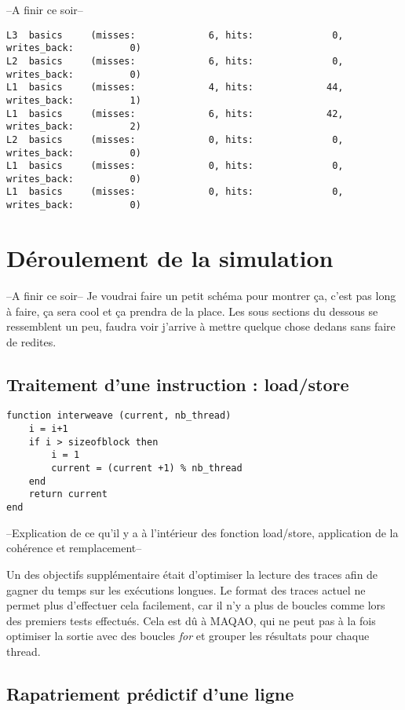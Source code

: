 --A finir ce soir--

\begin{lstlisting}
L3  basics     (misses:             6, hits:              0, writes_back:          0)
L2  basics     (misses:             6, hits:              0, writes_back:          0)
L1  basics     (misses:             4, hits:             44, writes_back:          1)
L1  basics     (misses:             6, hits:             42, writes_back:          2)
L2  basics     (misses:             0, hits:              0, writes_back:          0)
L1  basics     (misses:             0, hits:              0, writes_back:          0)
L1  basics     (misses:             0, hits:              0, writes_back:          0)
\end{lstlisting}

\section{Déroulement de la simulation}

--A finir ce soir--
Je voudrai faire un petit schéma pour montrer ça, c'est pas long à faire, ça sera cool et ça prendra de la place. Les sous sections du dessous se ressemblent un peu, faudra voir j'arrive à mettre quelque chose dedans sans faire de redites.

\subsection{Traitement d'une instruction : load/store}

\begin{lstlisting}
function interweave (current, nb_thread)
    i = i+1	 
    if i > sizeofblock then 
        i = 1 
        current = (current +1) % nb_thread
    end
    return current
end
\end{lstlisting}

--Explication de ce qu'il y a à l'intérieur des fonction load/store, application de la cohérence et remplacement--

Un des objectifs supplémentaire était d'optimiser la lecture des traces afin de gagner du temps sur les exécutions longues. Le format des traces actuel ne permet plus d'effectuer cela facilement, car il n'y a plus de boucles comme lors des premiers tests effectués. Cela est dû à MAQAO, qui ne peut pas à la fois optimiser la sortie avec des boucles \emph{for} et grouper les résultats pour chaque thread.

\subsection{Rapatriement prédictif d'une ligne}

